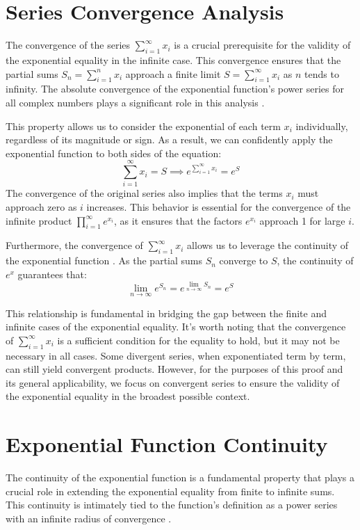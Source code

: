 \documentclass{article}
\begin{document}
\section*{Series Convergence Analysis}

The convergence of the series $\sum_{i=1}^\infty x_i$ is a crucial prerequisite for the validity of the exponential equality in the infinite case. This convergence ensures that the partial sums $S_n = \sum_{i=1}^n x_i$ approach a finite limit $S = \sum_{i=1}^\infty x_i$ as $n$ tends to infinity. The absolute convergence of the exponential function's power series for all complex numbers plays a significant role in this analysis \cite{source1, source2}.

This property allows us to consider the exponential of each term $x_i$ individually, regardless of its magnitude or sign. As a result, we can confidently apply the exponential function to both sides of the equation:
\[
\sum_{i=1}^\infty x_i = S \implies e^{\sum_{i=1}^\infty x_i} = e^S
\]
The convergence of the original series also implies that the terms $x_i$ must approach zero as $i$ increases. This behavior is essential for the convergence of the infinite product $\prod_{i=1}^\infty e^{x_i}$, as it ensures that the factors $e^{x_i}$ approach 1 for large $i$.

Furthermore, the convergence of $\sum_{i=1}^\infty x_i$ allows us to leverage the continuity of the exponential function \cite{source3}. As the partial sums $S_n$ converge to $S$, the continuity of $e^x$ guarantees that:
\[
\lim_{n\to \infty} e^{S_n} = e^{\lim_{n\to \infty} S_n} = e^S
\]

This relationship is fundamental in bridging the gap between the finite and infinite cases of the exponential equality. It's worth noting that the convergence of $\sum_{i=1}^\infty x_i$ is a sufficient condition for the equality to hold, but it may not be necessary in all cases. Some divergent series, when exponentiated term by term, can still yield convergent products. However, for the purposes of this proof and its general applicability, we focus on convergent series to ensure the validity of the exponential equality in the broadest possible context.

\section*{Exponential Function Continuity}

The continuity of the exponential function is a fundamental property that plays a crucial role in extending the exponential equality from finite to infinite sums. This continuity is intimately tied to the function's definition as a power series with an infinite radius of convergence \cite{source1, source2}.
\end{document}
